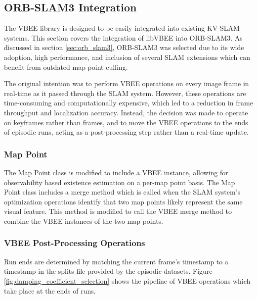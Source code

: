 \subsection{ORB-SLAM3 Integration}
\label{sec:orb_slam3_integration}

The VBEE library is designed to be easily integrated into existing KV-SLAM systems. This section covers the integration of libVBEE into ORB-SLAM3. As discussed in section \ref{sec:orb_slam3}, ORB-SLAM3 was selected due to its wide adoption, high performance, and inclusion of several SLAM extensions which can benefit from outdated map point culling.

The original intention was to perform VBEE operations on every image frame in real-time as it passed through the SLAM system. However, these operations are time-consuming and computationally expensive, which led to a reduction in frame throughput and localization accuracy. Instead, the decision was made to operate on keyframes rather than frames, and to move the VBEE operations to the ends of episodic runs, acting as a post-processing step rather than a real-time update.

\subsubsection{Map Point}

The Map Point class is modified to include a VBEE instance, allowing for observability based existence estimation on a per-map point basis. The Map Point class includes a merge method which is called when the SLAM system's optimization operations identify that two map points likely represent the same visual feature. This method is modified to call the VBEE merge method to combine the VBEE instances of the two map points. 

\subsubsection{VBEE Post-Processing Operations}

Run ends are determined by matching the current frame's timestamp to a timestamp in the splits file provided by the episodic datasets. Figure \ref{fig:damping_coefficient_selection} shows the pipeline of VBEE operations which take place at the ends of runs.

